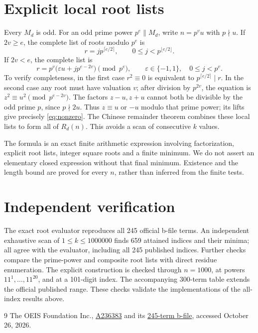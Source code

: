 \documentclass[10pt]{article}
\begin{document}
\section{Explicit local root lists}
Every $M_d$ is odd. For an odd prime power $p^e\parallel M_d$,
write $n=p^v u$ with $p\nmid u$. If $2v\ge e$, the complete
list of roots modulo $p^e$ is
\begin{equation}\label{eq:zero}
 r=j p^{\lceil e/2\rceil},\qquad 0\le j<p^{\lfloor e/2\rfloor}.
\end{equation}
If $2v<e$, the complete list is
\begin{equation}\label{eq:nonzero}
 r=p^v\bigl(\varepsilon u+j p^{e-2v}\bigr)\pmod{p^e},
 \qquad\varepsilon\in\{-1,1\},\quad0\le j<p^v.
\end{equation}
To verify completeness, in the first case $r^2\equiv0$ is
equivalent to $p^{\lceil e/2\rceil}\mid r$. In the second case
any root must have valuation $v$; after division by $p^{2v}$,
the equation is $z^2\equiv u^2\pmod{p^{e-2v}}$.
The factors $z-u,z+u$ cannot both be divisible by the odd prime
$p$, since $p\nmid2u$. Thus $z\equiv u$ or $-u$ modulo that
prime power; its lifts give precisely \eqref{eq:nonzero}.
The Chinese remainder theorem combines these local lists to form
all of $R_d(n)$. This avoids a scan of consecutive $k$ values.

The formula is an exact finite arithmetic expression involving
factorization, explicit root lists, integer square roots and a
finite minimum. We do not assert an elementary closed expression
without that final minimum. Existence and the length bound are
proved for every $n$, rather than inferred from the finite tests.

\section{Independent verification}
The exact root evaluator reproduces all 245 official b-file terms.
An independent exhaustive scan of $1\le k\le1000000$ finds 659
attained indices and their minima; all agree with the evaluator,
including all 245 published indices. Further checks compare the
prime-power and composite root lists with direct residue enumeration.
The explicit construction is checked through $n=1000$, at powers
$11^1,\ldots,11^{20}$, and at a 101-digit index. The accompanying
300-term table extends the official published range. These checks
validate the implementations of the all-index results above.

\begin{thebibliography}{9}
 The OEIS Foundation Inc.,
\href{https://oeis.org/A236383}{A236383} and its
\href{https://oeis.org/A236383/b236383.txt}{245-term b-file},
accessed October 26, 2026.
\end{thebibliography}
\end{document}

